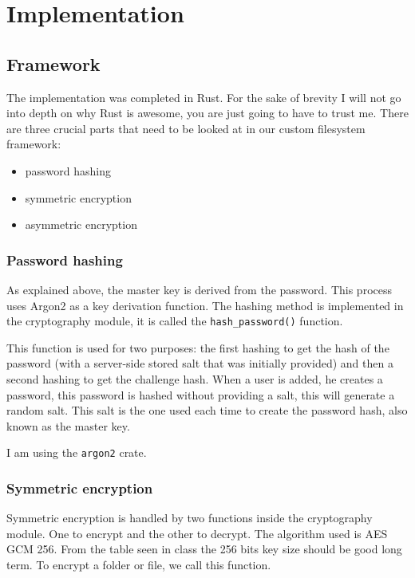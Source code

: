 \section{Implementation}
\subsection{Framework}
The implementation was completed in Rust. For the sake of brevity I will not go into depth on why Rust is awesome, you are just going to have to trust me. There are three crucial parts that need to be looked at in our custom filesystem framework:

\begin{itemize}
    \item password hashing
    \item symmetric encryption
    \item asymmetric encryption
\end{itemize}

\subsubsection{Password hashing}

As explained above, the master key is derived from the password. This process uses Argon2\cite{argon2} as a key derivation function. The hashing method is implemented in the cryptography module, it is called the \lstinline{hash_password()} function\cite{hashpass}.

This function is used for two purposes: the first hashing to get the hash of the password (with a server-side stored salt that was initially provided) and then a second hashing to get the challenge hash. When a user is added, he creates a password, this password is hashed without providing a salt, this will generate a random salt. This salt is the one used each time to create the password hash, also known as the master key. 

I am using the \lstinline{argon2} crate\cite{argon2docs}.

\subsubsection{Symmetric encryption}
Symmetric encryption is handled by two functions inside the cryptography module. One to encrypt and the other to decrypt. The algorithm used is AES GCM 256. From the table seen in class the 256 bits key size should be good long term. To encrypt a folder or file, we call this function.

